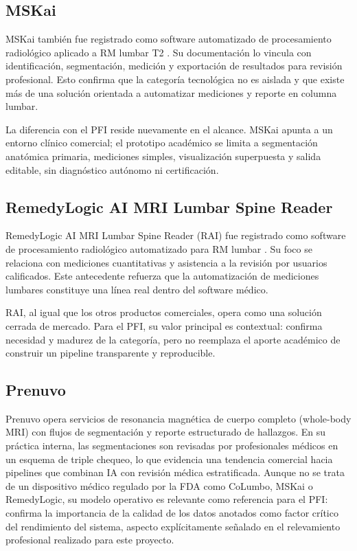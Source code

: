 \subsection{MSKai}

MSKai también fue registrado como software automatizado de procesamiento radiológico aplicado a RM lumbar T2 \parencite{fda_mskai_2024}. Su documentación lo vincula con identificación, segmentación, medición y exportación de resultados para revisión profesional. Esto confirma que la categoría tecnológica no es aislada y que existe más de una solución orientada a automatizar mediciones y reporte en columna lumbar.

La diferencia con el PFI reside nuevamente en el alcance. MSKai apunta a un entorno clínico comercial; el prototipo académico se limita a segmentación anatómica primaria, mediciones simples, visualización superpuesta y salida editable, sin diagnóstico autónomo ni certificación.

\subsection{RemedyLogic AI MRI Lumbar Spine Reader}

RemedyLogic AI MRI Lumbar Spine Reader (RAI) fue registrado como software de procesamiento radiológico automatizado para RM lumbar \parencite{fda_remedylogic_2024}. Su foco se relaciona con mediciones cuantitativas y asistencia a la revisión por usuarios calificados. Este antecedente refuerza que la automatización de mediciones lumbares constituye una línea real dentro del software médico.

RAI, al igual que los otros productos comerciales, opera como una solución cerrada de mercado. Para el PFI, su valor principal es contextual: confirma necesidad y madurez de la categoría, pero no reemplaza el aporte académico de construir un pipeline transparente y reproducible.

\subsection{Prenuvo}

Prenuvo opera servicios de resonancia magnética de cuerpo completo (whole-body MRI) con flujos de segmentación y reporte estructurado de hallazgos. En su práctica interna, las segmentaciones son revisadas por profesionales médicos en un esquema de triple chequeo, lo que evidencia una tendencia comercial hacia pipelines que combinan IA con revisión médica estratificada. Aunque no se trata de un dispositivo médico regulado por la FDA como CoLumbo, MSKai o RemedyLogic, su modelo operativo es relevante como referencia para el PFI: confirma la importancia de la calidad de los datos anotados como factor crítico del rendimiento del sistema, aspecto explícitamente señalado en el relevamiento profesional realizado para este proyecto.

